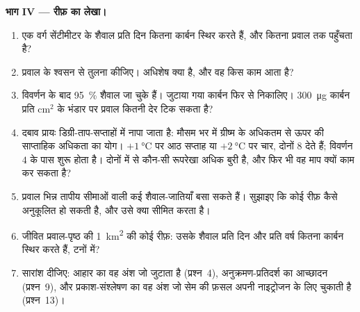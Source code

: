 \begin{problem}
\medskip
\noindent\textbf{भाग IV --- रीफ़ का लेखा।}
\begin{enumerate}[resume]
  \item एक वर्ग सेंटीमीटर के शैवाल प्रति दिन कितना कार्बन स्थिर करते
        हैं, और कितना प्रवाल तक पहुँचता है?
  \item प्रवाल के श्वसन से तुलना कीजिए। अधिशेष क्या है, और वह किस काम
        आता है?
  \item विवर्णन के बाद \qty{95}{\%} शैवाल जा चुके हैं। जुटाया गया
        कार्बन फिर से निकालिए। \qty{300}{\micro g} कार्बन प्रति
        cm$^{2}$ के भंडार पर प्रवाल कितनी देर टिक सकता है?
  \item दबाव प्रायः डिग्री-ताप-सप्ताहों में नापा जाता है: मौसम भर में
        ग्रीष्म के अधिकतम से ऊपर की साप्ताहिक अधिकता का योग।
        $+\qty{1}{\celsius}$ पर आठ सप्ताह या $+\qty{2}{\celsius}$ पर
        चार, दोनों $8$ देते हैं; विवर्णन $4$ के पास शुरू होता है।
        दोनों में से कौन-सी रूपरेखा अधिक बुरी है, और फिर भी वह माप
        क्यों काम कर सकता है?
  \item प्रवाल भिन्न तापीय सीमाओं वाली कई शैवाल-जातियाँ बसा सकते हैं।
        सुझाइए कि कोई रीफ़ कैसे अनुकूलित हो सकती है, और उसे क्या सीमित
        करता है।
  \item जीवित प्रवाल-पृष्ठ की \qty{1}{km^2} की कोई रीफ़: उसके शैवाल
        प्रति दिन और प्रति वर्ष कितना कार्बन स्थिर करते हैं, टनों में?
  \item सारांश दीजिए: आहार का वह अंश जो  जुटाता है
        (प्रश्न~4), अनुक्रमण-प्रतिदर्श का आच्छादन (प्रश्न~9), और
        प्रकाश-संश्लेषण का वह अंश जो सेम की फ़सल अपनी नाइट्रोजन के लिए
        चुकाती है (प्रश्न~13)।
\end{enumerate}
\end{problem}
